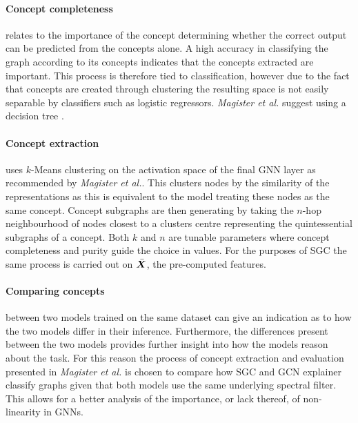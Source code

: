 \paragraph{Concept completeness}
relates to the importance of the concept determining whether the correct output can be predicted from the concepts alone.
A high accuracy in classifying the graph according to its concepts indicates that the concepts extracted are important.
This process is therefore tied to classification, however due to the fact that concepts are created through clustering the resulting space is not easily separable by classifiers such as logistic regressors.
\textit{Magister et al.}\cite{magister2021gcexplainer} suggest using a decision tree .



\paragraph{Concept extraction}
uses $k$-Means clustering on the activation space of the final GNN layer as recommended by \textit{Magister et al.}\cite{magister2021gcexplainer}.
This clusters nodes by the similarity of the representations as this is equivalent to the model treating these nodes as the same concept.
Concept subgraphs are then generating by taking the $n$-hop neighbourhood of nodes closest to a clusters centre representing the quintessential subgraphs of a concept.
Both $k$ and $n$ are tunable parameters where concept completeness and purity guide the choice in values.
For the purposes of SGC the same process is carried out on $\bar{{\bm{X}}}$, the pre-computed features.

\paragraph{Comparing concepts} between two models trained on the same dataset can give an indication as to how the two models differ in their inference.
Furthermore, the differences present between the two models provides further insight into how the models reason about the task.
For this reason the process of concept extraction and evaluation presented in \textit{Magister et al.}\cite{magister2021gcexplainer} is chosen to compare how SGC and GCN explainer classify graphs given that both models use the same underlying spectral filter.
This allows for a better analysis of the importance, or lack thereof, of non-linearity in GNNs.  

